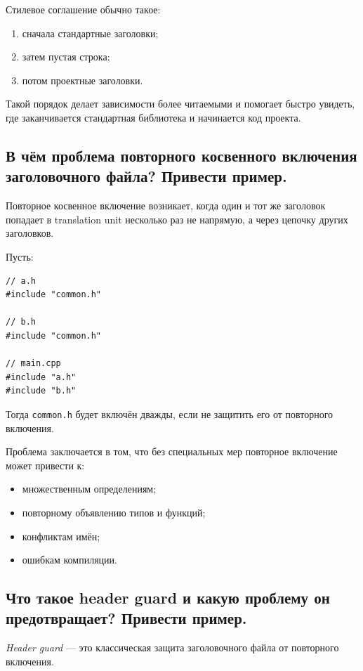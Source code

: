 Стилевое соглашение обычно такое:
\begin{enumerate}
    \item сначала стандартные заголовки;
    \item затем пустая строка;
    \item потом проектные заголовки.
\end{enumerate}

\begin{remark}
Такой порядок делает зависимости более читаемыми и помогает быстро увидеть, где заканчивается стандартная библиотека и начинается код проекта.
\end{remark}

\subsection{В чём проблема повторного косвенного включения заголовочного файла? Привести пример.}
\begin{definition}
Повторное косвенное включение возникает, когда один и тот же заголовок попадает в translation unit несколько раз не напрямую, а через цепочку других заголовков.
\end{definition}

\begin{example}
Пусть:
\begin{verbatim}
// a.h
#include "common.h"

// b.h
#include "common.h"

// main.cpp
#include "a.h"
#include "b.h"
\end{verbatim}

Тогда \texttt{common.h} будет включён дважды, если не защитить его от повторного включения.
\end{example}

Проблема заключается в том, что без специальных мер повторное включение может привести к:
\begin{itemize}
    \item множественным определениям;
    \item повторному объявлению типов и функций;
    \item конфликтам имён;
    \item ошибкам компиляции.
\end{itemize}

\subsection{Что такое header guard и какую проблему он предотвращает? Привести пример.}
\begin{definition}
\textit{Header guard} — это классическая защита заголовочного файла от повторного включения.
\end{definition}

